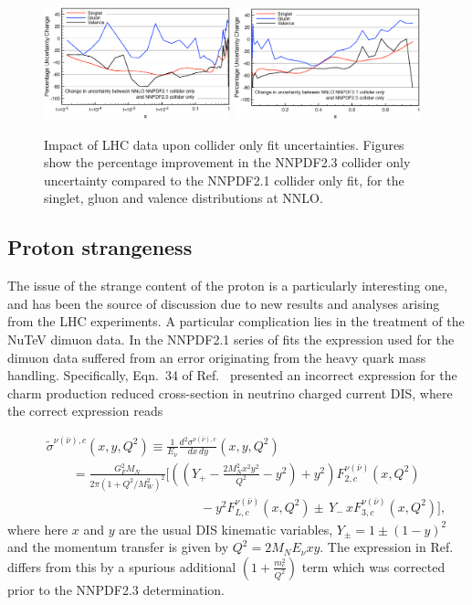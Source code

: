 \begin{figure}[h!]
\centering
\includegraphics[width=0.48\textwidth]{6-LHCimpact/figs/NNLOcollLogUnc.eps}
\includegraphics[width=0.48\textwidth]{6-LHCimpact/figs/NNLOcollLinUnc.eps}
\caption[Impact of LHC data upon collider only fit uncertainties]{Impact of LHC data upon collider only fit uncertainties. Figures show the percentage improvement in the NNPDF2.3 collider only uncertainty compared to the NNPDF2.1 collider only fit, for the singlet, gluon and valence distributions at NNLO.}
\label{fig:23vs21coll_unc}
\end{figure}



\subsection{Proton strangeness}
The issue of the strange content of the proton is a particularly interesting one, and has been the source of discussion due to new results and analyses arising from the LHC experiments. A particular complication lies in the treatment of the NuTeV dimuon data. 
In the NNPDF2.1 series of fits the expression used for the dimuon data suffered from an error originating from the heavy quark mass handling. Specifically, Eqn.~34 of Ref.~\cite{Ball:2011mu} presented an incorrect expression for the charm production reduced cross-section in neutrino charged current DIS, where the correct expression reads

\begin{eqnarray}
  \label{eq:nuxsecdimuon}
  &&\tilde{\sigma}^{\nu (\bar{\nu}),c}(x,y,Q^2)\equiv 
  \frac{1}{E_{\nu}}\frac{d^2\sigma^{\nu(\bar{\nu}),c}}{dx\,dy}
  (x,y,Q^2)\nonumber\\
  &&\qquad =\frac{G_F^2M_N}{2\pi(1+Q^2/M_W^2)^2}
  \Bigg[ 
    \left( \left( Y_+ - \frac{2M^2_Nx^2y^2}{Q^2} -y^2\right) +y^2\right)
    F_{2,c}^{\nu(\bar{\nu})}(x,Q^2) \nonumber\\ 
    &&\qquad\qquad\qquad\qquad\qquad\qquad
    -y^2F_{L,c}^{\nu(\bar{\nu})}(x,Q^2)\pm 
    \,Y_-\,xF_{3,c}^{\nu(\bar{\nu})}(x,Q^2)
    \Bigg], \,
\end{eqnarray}
where here $x$ and $y$ are the usual DIS kinematic variables, $ Y_\pm = 1\pm(1-y)^2$ and the momentum transfer is given by $Q^2=2M_NE_{\nu}xy$. The expression in Ref.~\cite{Ball:2011mu} differs from this by a spurious additional $\left( 1+ \frac{m_c^2}{Q^2}\right)$ term which was corrected prior to the NNPDF2.3 determination.

